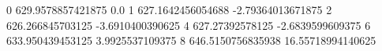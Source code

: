 0 629.9578857421875 0.0
1 627.1642456054688 -2.79364013671875
2 626.266845703125 -3.6910400390625
4 627.27392578125 -2.6839599609375
6 633.950439453125 3.9925537109375
8 646.5150756835938 16.55718994140625
